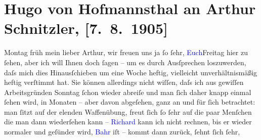 

               \section[Hugo von Hofmannsthal an Arthur Schnitzler, {[}7. 8. 1905{]}]{ Hugo von Hofmannsthal an Arthur Schnitzler, {[}7. 8. 1905{]}}\nopagebreak{}\rehead{ }\normalsize\beginnumbering{} \toendnotes[C]{\smallbreak\pagebreak[2]} 
\toendnotes[C]{\smallbreak}\pstart
           \raggedleft{}{\pb}Montag früh\pend
           \pstart{}mein lieber Arthur,\pend\pstart
           wir freuen uns ja ſo ſehr, \textcolor{blue}{Euch}{}Freitag hier zu ſehen, aber ich will Ihnen doch ſagen – um es durch
                    Ausſprechen loszuwerden, daſs mich dies Hinausſchieben um eine Woche heftig,
                    vielleicht unverhältnismäßig heftig verſtimmt hat. \label{OL450-1v}\label{OL450-1h}Sie können allerdings nicht wiſſen, {\pb}daſs ich aus gewiſſen
                    Arbeitsgründen Sonntag{ }ſchon wieder abreiſe und man ſich daher knapp
                    einmal ſehen wird, in Monaten – aber davon abgeſehen, ganz an und für ſich
                    betrachtet: man ſitzt auf der elenden Waffenübung, freut ſich ſo ſehr auf die
                    paar Menſchen {\pb}die man dann
                    wiederſehen kann – \textcolor{blue}{Richard}{}\ledrightnote{\textcolor{blue}{Richard Beer-Hofmann}} kann ich nicht
                    rechnen, bis er wieder normaler und geſünder wird, \textcolor{blue}{Bahr}{}\ledrightnote{\textcolor{blue}{Hermann Bahr}} iſt \label{K_L01539_1v}\label{K_L01539_1h} – kommt dann zurück, ſehnt ſich ſehr,
